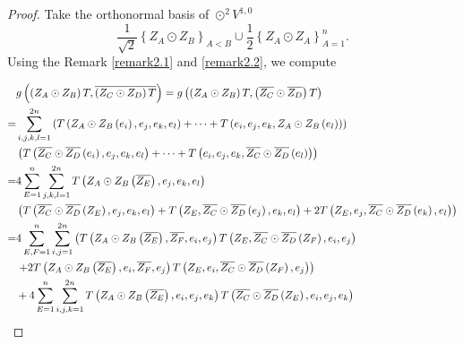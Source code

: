 \documentclass{amsart}
\theoremstyle{definition}
\theoremstyle{remark}
\numberwithin{equation}{section}
\begin{document}
\begin{proof}
Take the orthonormal basis of ${{ \odot ^2}{V^{1,0}}}$
$$\frac{1}{{\sqrt 2 }}{\left\{ {{Z_A} \odot {Z_B}} \right\}_{A < B}} \cup \frac{1}{2}\left\{ {{Z_A} \odot {Z_A}} \right\}_{A=1}^n.$$
 Using the Remark \ref{remark2.1} and \ref{remark2.2}, we compute

\begin{align*}
&g\left( {\left( {{Z_A} \odot {Z_B}} \right)T,\overline {\left( {{Z_C} \odot {Z_D}} \right)T} } \right)
 = g\left( {\left( {{Z_A} \odot {Z_B}} \right)T,\left( {\overline {{Z_C}}  \odot \overline {{Z_D}} } \right)T} \right)\\
   =& \sum\limits_{i,j,k,l = 1}^{2n} {\left( {T\left( {{Z_A} \odot {Z_B}\left( {{e_i}} \right),{e_j},{e_k},{e_l}} \right) +  \cdots  + T\left( {{e_i},{e_j},{e_k},{Z_A} \odot {Z_B}\left( {{e_l}} \right)} \right)} \right)}  \\
  &\left( {T\left( {\overline {{Z_C}}  \odot \overline {{Z_D}} \left( {{e_i}} \right),{e_j},{e_k},{e_l}} \right) +  \cdots  + T\left( {{e_i},{e_j},{e_k},\overline {{Z_C}}  \odot \overline {{Z_D}} \left( {{e_l}} \right)} \right)} \right) \hfill \\
   =& 4\sum\limits_{E = 1}^n {\sum\limits_{j,k,l = 1}^{2n} {T\left( {{Z_A} \odot {Z_B}\left( {\overline {{Z_E}} } \right),{e_j},{e_k},{e_l}} \right)} }   \\
  &\left( {T\left( {\overline {{Z_C}}  \odot \overline {{Z_D}} \left( {{Z_E}} \right),{e_j},{e_k},{e_l}} \right) + T\left( {{Z_E},\overline {{Z_C}}  \odot \overline {{Z_D}} \left( {{e_j}} \right),{e_k},{e_l}} \right) + 2T\left( {{Z_E},{e_j},\overline {{Z_C}}  \odot \overline {{Z_D}} \left( {{e_k}} \right),{e_l}} \right)} \right) \\
 =& 4\sum\limits_{E,F=1}^n {\sum\limits_{i,j = 1}^{2n} {\left( {T\left( {{Z_A} \odot {Z_B}\left( {\overline {{Z_E}} } \right),\overline {{Z_F}} ,{e_i},{e_j}} \right)T\left( {{Z_E},\overline {{Z_C}}  \odot \overline {{Z_D}} \left( {{Z_F}} \right),{e_i},{e_j}} \right)} \right.} } \\
& \left. { + 2T\left( {{Z_A} \odot {Z_B}\left( {\overline {{Z_E}} } \right),{e_i},\overline {{Z_F}} ,{e_j}} \right)T\left( {{Z_E},{e_i},\overline {{Z_C}}  \odot \overline {{Z_D}} \left( {{Z_F}} \right),{e_j}} \right)} \right)\\
 &+ 4\sum\limits_{E=1}^n {\sum\limits_{i,j,k = 1}^{2n} {T\left( {{Z_A} \odot {Z_B}\left( {\overline {{Z_E}} } \right),{e_i},{e_j},{e_k}} \right)T\left( {\overline {{Z_C}}  \odot \overline {{Z_D}} \left( {{Z_E}} \right),{e_i},{e_j},{e_k}} \right)} } \\

\end{align*}
\end{proof}
\end{document}
